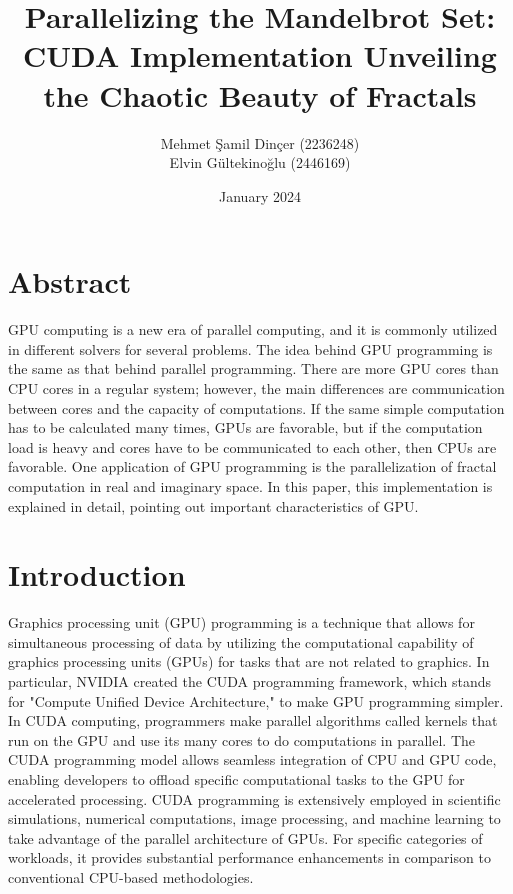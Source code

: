 \documentclass{article}
\title{Parallelizing the Mandelbrot Set: CUDA Implementation Unveiling the Chaotic Beauty of Fractals}
\author{Mehmet Şamil Dinçer (2236248)\\
        Elvin Gültekinoğlu (2446169)}
\date{January 2024}
\begin{document}
\maketitle

\section{Abstract}
GPU computing is a new era of parallel computing, and it is commonly utilized in different solvers for several problems. The idea behind GPU programming is the same as that behind parallel programming. There are more GPU cores than CPU cores in a regular system; however, the main differences are communication between cores and the capacity of computations. If the same simple computation has to be calculated many times, GPUs are favorable, but if the computation load is heavy and cores have to be communicated to each other, then CPUs are favorable. One application of GPU programming is the parallelization of fractal computation in real and imaginary space. In this paper, this implementation is explained in detail, pointing out important characteristics of GPU. 





\clearpage
\section{Introduction}


Graphics processing unit (GPU) programming is a technique that allows for simultaneous processing of data by utilizing the computational capability of graphics processing units (GPUs) for tasks that are not related to graphics. In particular, NVIDIA created the CUDA programming framework, which stands for "Compute Unified Device Architecture," to make GPU programming simpler\cite{noauthor_cuda_nodate}. In CUDA computing, programmers make parallel algorithms called kernels that run on the GPU and use its many cores to do computations in parallel. The CUDA programming model allows seamless integration of CPU and GPU code, enabling developers to offload specific computational tasks to the GPU for accelerated processing. CUDA programming is extensively employed in scientific simulations, numerical computations, image processing, and machine learning to take advantage of the parallel architecture of GPUs. For specific categories of workloads, it provides substantial performance enhancements in comparison to conventional CPU-based methodologies. 
\end{document}
